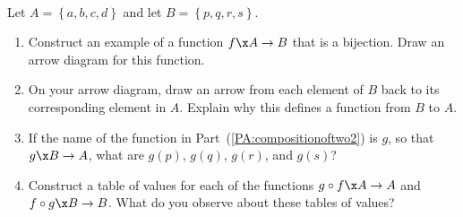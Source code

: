 \begin{previewactivity} \label{PA:compositionoftwo} \hfill \\
Let  $A = \left\{ {a, b, c, d} \right\}$ and  let  $B = \left\{ {p, q, r, s} \right\}$.

\begin{enumerate}
\item Construct an example of a function  $f\x A \to B$  that is a bijection.  Draw an arrow diagram for this function.

\item On your arrow diagram, draw an arrow from each element of  $B$  back to its corresponding element in  $A$.  Explain why this defines a function  from  $B$  to  $A$.  \label{PA:compositionoftwo2}

\item If the name of the function in Part~(\ref{PA:compositionoftwo2}) is  $g$, so that  
$g\x B \to A$, what are  
$g( p )$, $g( q )$, $g( r )$, and $g( s )$?

\item Construct a table of values for each of the functions $g \circ f\x A \to A$  and  
$f \circ g\x B \to B$. What do you observe about these tables of values?
\label{PA:compositionoftwo4}


\end{enumerate}
\end{previewactivity}
\hbreak
%
%
